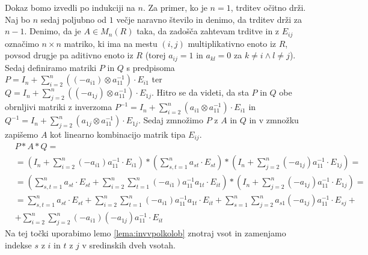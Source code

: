 \documentclass[mat1]{fmfdelo}
\begin{document}
\begin{dokaz}
	Dokaz bomo izvedli po indukciji na $n$. Za primer, ko je $n = 1$, trditev očitno drži. Naj bo $n$ sedaj poljubno od $1$ večje naravno število in denimo, da trditev drži za $n-1$. Denimo, da je $A\in M_n(R)$ taka, da zadošča zahtevam trditve in z $E_{ij}$ označimo $n\times n$ matriko, ki ima na mestu $(i, j)$ multiplikativno enoto iz $R$, povsod drugje pa aditivno enoto iz $R$ (torej $a_{ij} = 1$ in $a_{kl} = 0$ za $k\neq i \land l\neq j$). Sedaj definiramo matriki $P$ in $Q$ s predpisoma $P = I_n + \sum_{i = 2}^{n}((-a_{i1})\otimes a_{11}^{-1})\cdot E_{i1}$ ter $Q = I_n + \sum_{j = 2}^{n}((-a_{1j})\otimes a_{11}^{-1})\cdot E_{1j}$. Hitro se da videti, da sta $P$ in $Q$ obe obrnljivi matriki z inverzoma $P^{-1} = I_n + \sum_{i = 2}^{n}(a_{i1}\otimes a_{11}^{-1})\cdot E_{i1}$ in $Q^{-1} =I_n + \sum_{j = 2}^{n}(a_{1j}\otimes a_{11}^{-1})\cdot E_{1j}$. Sedaj zmnožimo $P$ z $A$ in $Q$ in v zmnožku zapišemo $A$ kot linearno kombinacijo matrik tipa $E_{ij}$.
	\begin{align*}
		& P*A*Q = \\ 
		&= \left(I_n + \sum_{i = 2}^{n}(-a_{i1}) a_{11}^{-1}\cdot E_{i1}\right)*\left(\sum_{s, t = 1}^{n}a_{st}\cdot E_{st}\right)*\left(I_n + \sum_{j = 2}^{n}(-a_{1j})a_{11}^{-1}\cdot E_{1j}\right) = \\
		&=\left(\sum_{s, t = 1}^{n}a_{st}\cdot E_{st} + \sum_{i = 2}^{n}\sum_{t = 1}^{n} (-a_{i1})a_{11}^{-1}a_{1t}\cdot E_{it}\right)*\left(I_n + \sum_{j = 2}^{n}(-a_{1j})a_{11}^{-1}\cdot E_{1j}\right) = \\
		&= \sum_{s, t = 1}^{n}a_{st}\cdot E_{st} + \sum_{i = 2}^{n}\sum_{t = 1}^{n} (-a_{i1})a_{11}^{-1}a_{1t}\cdot E_{it} + \sum_{s = 1}^{n}\sum_{j = 2}^{n} a_{s1}(-a_{1j})a_{11}^{-1}\cdot E_{sj} + \\
		&+ \sum_{i = 2}^{n}\sum_{j=2}^{n} (-a_{i1})(-a_{1j})a_{11}^{-1}\cdot E_{it}
	\end{align*}
	Na tej točki uporabimo lemo \ref{lema:invvpolkolob} znotraj vsot in zamenjamo indekse $s$ z $i$ in $t$ z $j$ v sredinskih dveh vsotah.
	

\end{dokaz}
\end{document}

